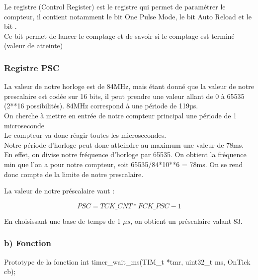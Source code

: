 Le registre  (Control Register) est le registre qui permet de paramétrer le compteur, il contient notamment le bit One Pulse Mode, le bit Auto Reload et le bit .\\
Ce bit permet de lancer le comptage et de savoir si le comptage est terminé (valeur de  atteinte)







\newpage
\subsubsection{Registre PSC}


La valeur de notre horloge est de 84MHz, mais étant donné que la valeur de notre prescalaire est codée sur 16 bits, il peut prendre une valeur allant de 0 à 65535 (2**16 possibilités). 
84MHz correspond à une période de 119µs. \\On cherche à mettre en entrée de notre compteur principal une période de 1 microseconde\\
Le compteur va donc réagir toutes les microsecondes.\\

Notre période d'horloge peut donc atteindre au maximum une valeur de 78ms. En effet, on divise notre fréquence d'horloge par 65535. 
On obtient la fréquence min que l'on a pour notre compteur, soit 65535/84*10**6 = 78ms.
On se rend donc compte de la limite de notre prescalaire.

La valeur de notre préscalaire vaut : 

\begin{equation}
PSC = TCK\_CNT*FCK\_PSC-1
\end{equation}

En choisissant une base de temps de 1 $\mu s$, on obtient un préscalaire valant 83.


\newpage
\subsubsection{b) Fonction}
\begin{Cpp}{Prototype de la fonction} 
int timer_wait_ms(TIM_t *tmr, uint32_t ms, OnTick cb);
\end{Cpp}

